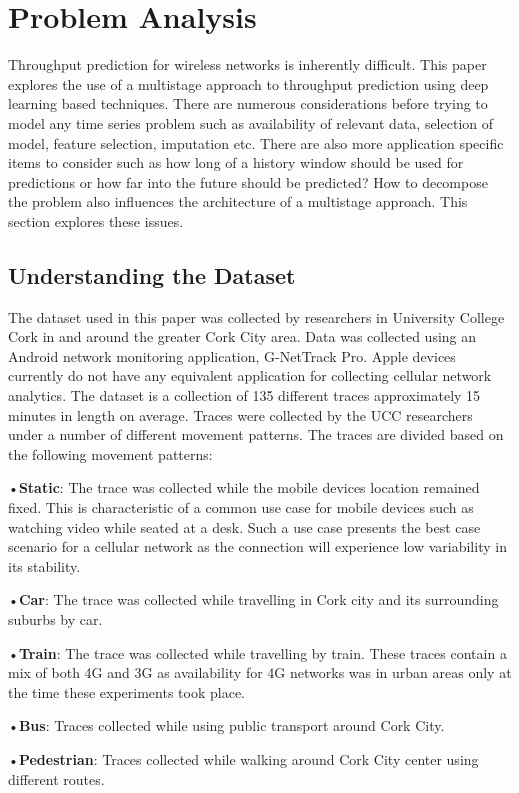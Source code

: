\chapter{Problem Analysis}
Throughput prediction for wireless networks is inherently difficult. This paper explores the use of a multistage approach to throughput prediction using deep learning based techniques. There are numerous considerations before trying to model any time series problem such as availability of relevant data, selection of model, feature selection, imputation etc. There are also more application specific items to consider such as how long of a history window should be used for predictions or how far into the future should be predicted? How to decompose the problem also influences the architecture of a multistage approach. This section explores these issues.

\section{Understanding the Dataset}
The dataset used in this paper was collected by researchers in University College Cork in and around the greater Cork City area. Data was collected using an Android network monitoring application, G-NetTrack Pro. Apple devices currently do not have any equivalent application for collecting cellular network analytics. The dataset is a collection of 135 different traces approximately 15 minutes in length on average. Traces were collected by the UCC researchers under a number of different movement patterns. The traces are divided based on the following movement patterns:

•\textbf{Static}: The trace was collected while the mobile devices location remained fixed. This is characteristic of a common use case for mobile devices such as watching video while seated at a desk. Such a use case presents the best case scenario for a cellular network as the connection will experience low variability in its stability.

•\textbf{Car}: The trace was collected while travelling in Cork city and its surrounding suburbs by car.

•\textbf{Train}: The trace was collected while travelling by train. These traces contain a mix of both 4G and 3G as availability for 4G networks was in urban areas only at the time these experiments took place.

•\textbf{Bus}: Traces collected while using public transport around Cork City.

•\textbf{Pedestrian}: Traces collected while walking around Cork City center using different routes.

